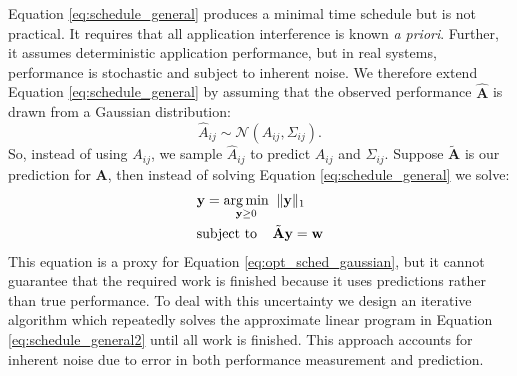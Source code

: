 Equation \eqref{eq:schedule_general} produces a minimal time schedule
but is not practical.  It requires that all application interference
is known \emph{a priori}.  Further, it assumes deterministic
application performance, but in real systems, performance is
stochastic and subject to inherent noise.  We therefore extend
Equation \eqref{eq:schedule_general} by assuming that the observed
performance $\hat{\mathbf{A}}$ is drawn from a Gaussian distribution:
\begin{equation}
\label{eq:opt_sched_gaussian}
\hat{A}_{ij} \sim \mathcal{N}(A_{ij},\Sigma_{ij}).
\end{equation}
So, instead of using $A_{ij}$, we sample $\hat{A}_{ij}$ to predict
$A_{ij}$ and $\Sigma_{ij}$.  Suppose $\tilde{\mathbf{A}}$ is our
prediction for $\mathbf{A}$, then instead of solving Equation
\eqref{eq:schedule_general} we solve:
\begin{equation}
\begin{aligned}
\centering
			\label{eq:schedule_general2}
			&   \y =\underset{  \y \geq 0}{\argmin} \;\;   \| \y \|_1\\
                        &  \text{subject to} \;\;\;\; \tilde{\mathbf{A}} \y = \w 
\end{aligned}
\end{equation}
This equation is a proxy for Equation \eqref{eq:opt_sched_gaussian},
but it cannot guarantee that the required work is finished because it
uses predictions rather than true performance.  To deal with this
uncertainty we design an iterative algorithm which repeatedly solves
the approximate linear program in Equation
\eqref{eq:schedule_general2} until all work is finished.  This
approach accounts for inherent noise due to error in both performance
measurement and prediction.

